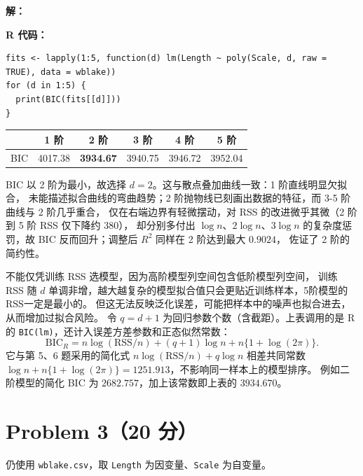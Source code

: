 \documentclass[12pt,a4paper]{article}
\begin{document}
\begin{answerbox}
\textbf{解：}

\textbf{R 代码：}
\begin{lstlisting}[style=rcode]
fits <- lapply(1:5, function(d) lm(Length ~ poly(Scale, d, raw = TRUE), data = wblake))
for (d in 1:5) {
  print(BIC(fits[[d]]))
}
\end{lstlisting}

\begin{center}
\small
\begin{tabular}{lccccc}
\toprule
 & 1 阶 & 2 阶 & 3 阶 & 4 阶 & 5 阶 \\
\midrule
BIC & 4017.38 & \textbf{3934.67} & 3940.75 & 3946.72 & 3952.04 \\
\bottomrule
\end{tabular}
\end{center}

BIC 以 2 阶为最小，故选择 $d=2$。这与散点叠加曲线一致：1 阶直线明显欠拟合，
未能描述拟合曲线的弯曲趋势；2 阶抛物线已刻画出数据的特征，而 3-5 阶曲线与 2 阶几乎重合，
仅在右端边界有轻微摆动，对 RSS 的改进微乎其微（2 阶到 5 阶 RSS 仅下降约 $380$），
却分别多付出 $\log n$、$2\log n$、$3\log n$ 的复杂度惩罚，故 BIC 反而回升；调整后 $R^2$ 同样在 2 阶达到最大 $0.9024$，
佐证了 2 阶的简约性。

不能仅凭训练 RSS 选模型，因为高阶模型列空间包含低阶模型列空间，
训练 RSS 随 $d$ 单调非增，越大越复杂的模型拟合值只会更贴近训练样本，5阶模型的$\mathrm{RSS}$一定是最小的。
但这无法反映泛化误差，可能把样本中的噪声也拟合进去，
从而增加过拟合风险。
令 $q=d+1$ 为回归参数个数（含截距）。上表调用的是 R 的 \texttt{BIC(lm)}，还计入误差方差参数和正态似然常数：
$$
\mathrm{BIC}_{R}=n\log(\mathrm{RSS}/n)+(q+1)\log n+n\{1+\log(2\pi)\}.
$$
它与第 5、6 题采用的简化式 $n\log(\mathrm{RSS}/n)+q\log n$ 相差共同常数
$\log n+n\{1+\log(2\pi)\}=1251.913$，不影响同一样本上的模型排序。
例如二阶模型的简化 BIC 为 $2682.757$，加上该常数即上表的 $3934.670$。
\end{answerbox}

\section{Problem 3（20 分）}

仍使用 \texttt{wblake.csv}，取 \texttt{Length} 为因变量、\texttt{Scale} 为自变量。

\subsection{}
\end{document}
